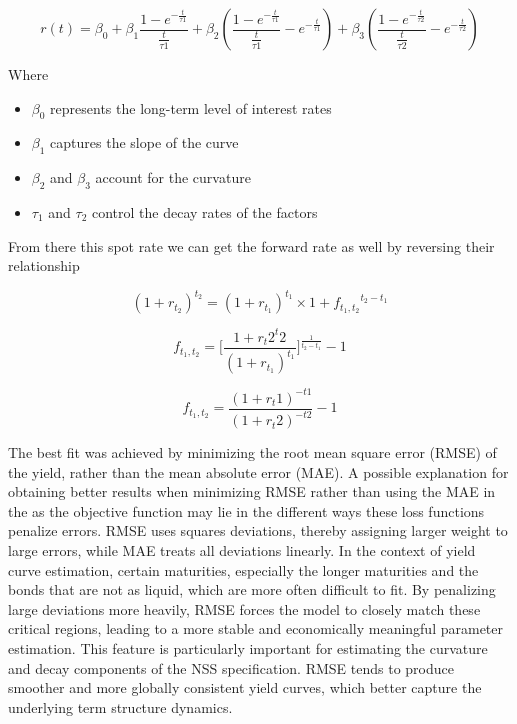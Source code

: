 \documentclass[11pt,oneside]{scrartcl}
\begin{document}
$$
r\left(t\right)=\beta_0+\beta_1\frac{1-e^{-\frac{t}{\tau1}}}{\frac{t}{\tau1}}+\beta_2\left(\frac{1-e^{-\frac{t}{\tau1}}}{\frac{t}{\tau1}}-e^{-\frac{t}{\tau1}}\right)
+\beta_3\left(\frac{1-e^{-\frac{t}{\tau2}}}{\frac{t}{\tau2}}-e^{-\frac{t}{\tau2}}\right)
$$

Where 
\begin{itemize}
    \item $\beta_0$ represents the long-term level of interest rates
    \item $\beta_1$ captures the slope of the curve
    \item $\beta_2$ and $\beta_3$ account for the curvature
    \item $\tau_1$ and $\tau_2$ control the decay rates of the factors
\end{itemize}

From there this spot rate we can get the forward rate as well by reversing their relationship 

$$(1+r_{t_2})^{t_2}=(1+r_{t_1})^{t_1}\times{1+f_{t_1,t_2}}^{t_2-t_1}$$


$$f_{t_1,t_2}=\bigg[\frac{{1+r_t2}^t2}{(1+r_{t_1})^{t_1}}\bigg]^{\frac{1}{t_2-t_1}}-1$$

$$f_{t_1,t_2}=\frac{(1+r_t1)^{-t1}}{(1+r_t2)^{-t2}} -1$$

The best fit was achieved by minimizing the root mean square error (RMSE) of the yield, rather than the mean absolute error (MAE).
A possible explanation for obtaining better results when minimizing RMSE rather than using the MAE in the as the objective function may lie in the different ways these loss functions penalize errors. RMSE uses squares deviations, thereby assigning larger weight to large errors, while MAE treats all deviations linearly. In the context of yield curve estimation, certain maturities, especially the longer maturities and the bonds that are not as liquid, which are more often difficult to fit. By penalizing large deviations more heavily, RMSE forces the model to closely match these critical regions, leading to a more stable and economically meaningful parameter estimation. This feature is particularly important for estimating the curvature and decay components of the NSS specification. RMSE tends to produce smoother and more globally consistent yield curves, which better capture the underlying term structure dynamics.
\end{document}
